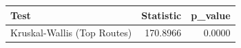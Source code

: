 \begin{tabular}{lrr}
\toprule
Test & Statistic & p\_value \\
\midrule
Kruskal-Wallis (Top Routes) & 170.8966 & 0.0000 \\
\bottomrule
\end{tabular}
